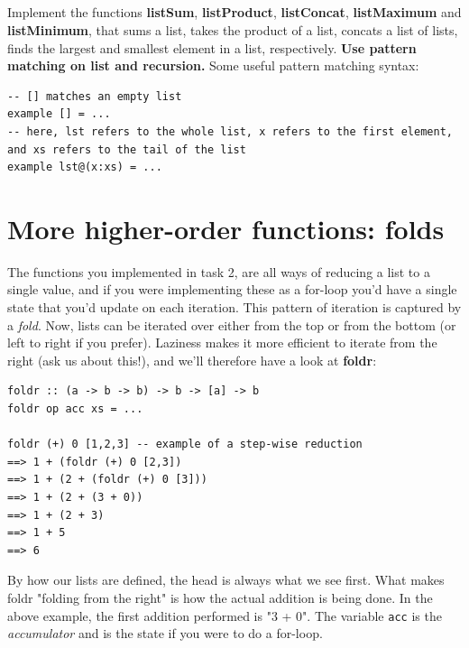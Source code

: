 \documentclass{article}
\begin{document}
\subsection{}
Implement the functions \textbf{listSum}, \textbf{listProduct}, \textbf{listConcat}, \textbf{listMaximum} and \textbf{listMinimum}, that sums a list, takes the product of a list, concats a list of lists, finds the largest and smallest element in a list, respectively. \textbf{Use pattern matching on list and recursion.} Some useful pattern matching syntax:
\begin{lstlisting}
-- [] matches an empty list
example [] = ...
-- here, lst refers to the whole list, x refers to the first element, and xs refers to the tail of the list
example lst@(x:xs) = ...
\end{lstlisting}

\section{More higher-order functions: folds}

The functions you implemented in task 2, are all ways of reducing a list to a single value, and if you were implementing these as a for-loop you'd have a single state that you'd update on each iteration. This pattern of iteration is captured by a \emph{fold}. Now, lists can be iterated over either from the top or from the bottom (or left to right if you prefer). Laziness makes it more efficient to iterate from the right (ask us about this!), and we'll therefore have a look at \textbf{foldr}:
\begin{lstlisting}
foldr :: (a -> b -> b) -> b -> [a] -> b
foldr op acc xs = ... 

foldr (+) 0 [1,2,3] -- example of a step-wise reduction
==> 1 + (foldr (+) 0 [2,3])
==> 1 + (2 + (foldr (+) 0 [3]))
==> 1 + (2 + (3 + 0))
==> 1 + (2 + 3)
==> 1 + 5
==> 6
\end{lstlisting}
By how our lists are defined, the head is always what we see first. What makes foldr "folding from the right" is how the actual addition is being done. In the above example, the first addition performed is "3 + 0". The variable \texttt{acc} is the \emph{accumulator} and is the state if you were to do a for-loop. 
\end{document}
